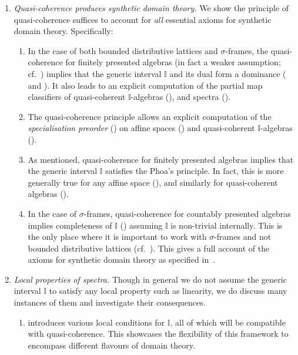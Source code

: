 \documentclass[a4paper,12pt]{amsart}
\theoremstyle{definition}
\newcommand{\mbb}[1]{\mathbb{#1}}
\newcommand{\I}{\mbb I}
\begin{document}
\begin{enumerate}[leftmargin=*]
  \item \emph{Quasi-coherence produces synthetic domain theory.} We show the principle of quasi-coherence suffices to account for \emph{all} essential axioms for synthetic domain theory. Specifically:
  \begin{enumerate}
    \item\label{contribution:dominance} In the case of both bounded distributive lattices and $\sigma$-frames, the quasi-coherence for finitely presented algebras (in fact a weaker assumption; cf.\ ) implies that the generic interval $\I$ and its dual form a dominance ( and ). It also leads to an explicit computation of the partial map classifiers of quasi-coherent $\I$-algebras (), and spectra ().
    \item The quasi-coherence principle allows an explicit computation of the \emph{specialisation preorder} () on affine spaces () and quasi-coherent $\I$-algebras ().
    \item As mentioned, quasi-coherence for finitely presented algebras implies that the generic interval $\I$ satisfies the Phoa's principle. In fact, this is more generally true for any affine space (), and similarly for quasi-coherent algebras ().
    \item In the case of $\sigma$-frames, quasi-coherence for countably presented algebras implies completeness of $\I$ () assuming $\I$ is non-trivial internally. 
    This is the only place where it is important to work with $\sigma$-frames and not bounded distributive lattices (cf.~). This gives a full account of the axioms for synthetic domain theory as specified in~\cite{hyland1990first}. 
  \end{enumerate}

  \item \emph{Local properties of spectra.} Though in general we do not assume the generic interval $\I$ to satisfy any local property such as linearity, we do discuss many instances of them and investigate their consequences.
  \begin{enumerate}

    \item {} introduces various local conditions for $\I$, all of which will be compatible with quasi-coherence. This showcases the flexibility of this framework to encompass different flavours of domain theory.


\end{enumerate}
\end{enumerate}
\end{document}
